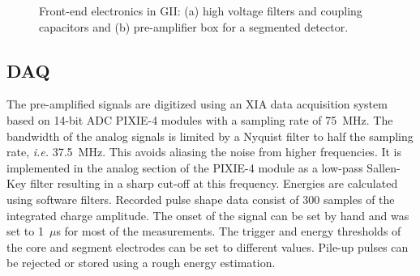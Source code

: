 \begin{figure}[tbhp]
\centering
{}\hfil%
%
\caption{Front-end electronics in GII: (a) high voltage filters and coupling capacitors and (b) pre-amplifier box for a segmented detector.}
\label{fig:tt:gef}
\end{figure}

\subsection{DAQ} 
\label{sec:tt:daq}
The pre-amplified signals are digitized using an XIA data acquisition system \cite{Daq06} based on 14-bit ADC PIXIE-4 modules with a sampling rate of 75~MHz. The bandwidth of the analog signals is limited by a Nyquist filter to half the sampling rate, \textit{i.e.} 37.5~MHz. This avoids aliasing the noise from higher frequencies. It is implemented in the analog section of the PIXIE-4 module as a low-pass Sallen-Key filter resulting in a sharp cut-off at this frequency. Energies are calculated using software filters. Recorded pulse shape data consist of 300 samples of the integrated charge amplitude. The onset of the signal can be set by hand and was set to 1~$\mu$s for most of the measurements. The trigger and energy thresholds of the core and segment electrodes can be set to different values. Pile-up pulses can be rejected or stored using a rough energy estimation.


